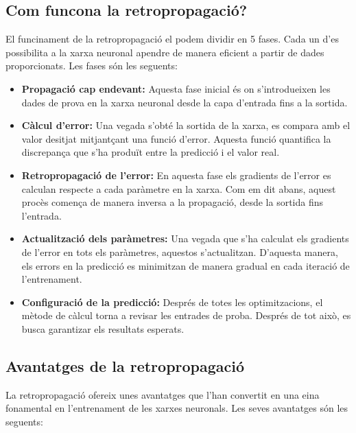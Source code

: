\subsection{Com funcona la retropropagació?}
El funcinament de la retropropagació el podem dividir en 5 fases. Cada un d'es possibilita a la xarxa neuronal apendre de manera eficient a partir de dades proporcionats. Les fases són les seguents:
\begin{itemize}
 \item \textbf{Propagació cap endevant:} Aquesta fase inicial és on s'introdueixen les dades de prova en la xarxa neuronal desde la capa d'entrada fins a la sortida.
 \item \textbf{Càlcul d'error:} Una vegada s'obté la sortida de la xarxa, es compara amb el valor desitjat mitjantçant una funció d'error. Aquesta funció quantifica la discrepança que s'ha produït entre la predicció i el valor real.
 \item \textbf{Retropropagació de l'error:} En aquesta fase els gradients de l'error es calculan respecte a cada paràmetre en la xarxa. Com em dit abans, aquest procès comença de manera inversa a la propagació, desde la sortida fins l'entrada.
 \item \textbf{Actualització dels paràmetres:} Una vegada que s'ha calculat els gradients de l'error en tots els paràmetres, aquestos s'actualitzan. D'aquesta manera, els errors en la predicció es minimitzan de manera gradual en cada iteració de l'entrenament.
 \item \textbf{Configuració de la predicció:} Després de totes les optimitzacions, el mètode de càlcul torna a revisar les entrades de proba. Després de tot això, es busca garantizar els resultats esperats.
\end{itemize}
\subsection{Avantatges de la retropropagació}
La retropropagació ofereix unes avantatges que l'han convertit en una eina fonamental en l'entrenament de les xarxes neuronals. Les seves avantatges són les seguents:

